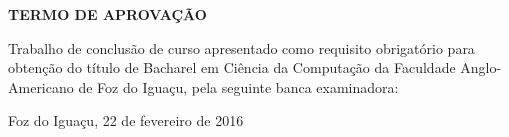 \begin{folhadeaprovacao} %
\begin{center}
	\vspace*{1cm}  
  	\large\textbf{TERMO DE APROVAÇÃO}
  	
  	\vspace*{1cm} %
  	{\large\textbf\imprimirautor}

   \vspace*{1cm} %
    {\large\textbf\imprimirtitulo}   
 \end{center}     
  
	
	\hspace{.4\textwidth}
	\SingleSpace\noindent\normalsize{Trabalho de conclusão de curso apresentado como requisito obrigatório para obtenção do título de Bacharel em Ciência da Computação da Faculdade Anglo-Americano de Foz do Iguaçu, pela seguinte banca examinadora:}
   
    
  
   \vspace*{0.5cm}  %
   \vspace*{2.5cm}
   \begin{center}
   	{Foz do Iguaçu, 22 de fevereiro de 2016}
   \end{center}
   
 
\end{folhadeaprovacao}